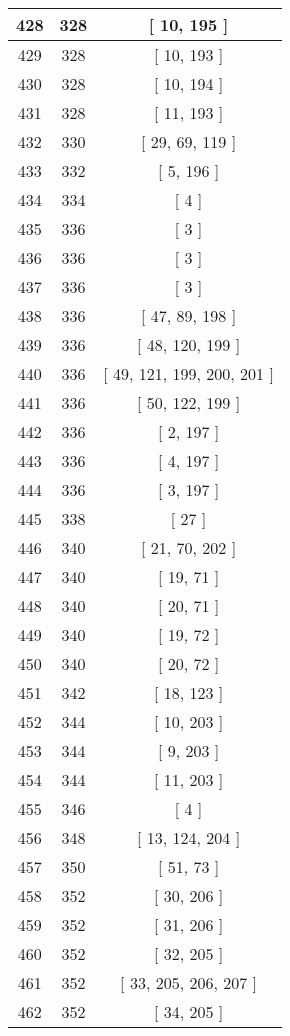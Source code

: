 \begin{center}
\begin{longtable}[H]{|| c c c ||}
\hline
428 & 328 & [ 10, 195 ] \\ 
\hline
429 & 328 & [ 10, 193 ] \\ 
\hline
430 & 328 & [ 10, 194 ] \\ 
\hline
431 & 328 & [ 11, 193 ] \\ 
\hline
432 & 330 & [ 29, 69, 119 ] \\ 
\hline
433 & 332 & [ 5, 196 ] \\ 
\hline
434 & 334 & [ 4 ] \\ 
\hline
435 & 336 & [ 3 ] \\ 
\hline
436 & 336 & [ 3 ] \\ 
\hline
437 & 336 & [ 3 ] \\ 
\hline
438 & 336 & [ 47, 89, 198 ] \\ 
\hline
439 & 336 & [ 48, 120, 199 ] \\ 
\hline
440 & 336 & [ 49, 121, 199, 200, 201 ] \\ 
\hline
441 & 336 & [ 50, 122, 199 ] \\ 
\hline
442 & 336 & [ 2, 197 ] \\ 
\hline
443 & 336 & [ 4, 197 ] \\ 
\hline
444 & 336 & [ 3, 197 ] \\ 
\hline
445 & 338 & [ 27 ] \\ 
\hline
446 & 340 & [ 21, 70, 202 ] \\ 
\hline
447 & 340 & [ 19, 71 ] \\ 
\hline
448 & 340 & [ 20, 71 ] \\ 
\hline
449 & 340 & [ 19, 72 ] \\ 
\hline
450 & 340 & [ 20, 72 ] \\ 
\hline
451 & 342 & [ 18, 123 ] \\ 
\hline
452 & 344 & [ 10, 203 ] \\ 
\hline
453 & 344 & [ 9, 203 ] \\ 
\hline
454 & 344 & [ 11, 203 ] \\ 
\hline
455 & 346 & [ 4 ] \\ 
\hline
456 & 348 & [ 13, 124, 204 ] \\ 
\hline
457 & 350 & [ 51, 73 ] \\ 
\hline
458 & 352 & [ 30, 206 ] \\ 
\hline
459 & 352 & [ 31, 206 ] \\ 
\hline
460 & 352 & [ 32, 205 ] \\ 
\hline
461 & 352 & [ 33, 205, 206, 207 ] \\ 
\hline
462 & 352 & [ 34, 205 ] \\ 

\end{longtable}
\end{center}
